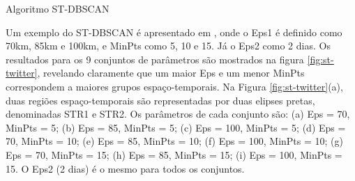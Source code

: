 \pagebreak
\begin{algorithm}[!ht]
	\SetSpacedAlgorithm
	\caption{\label{alg:algoritmo_stdbscan}Algoritmo \acrshort{ST-DBSCAN}}
\end{algorithm}

Um exemplo do \acrshort{ST-DBSCAN} é apresentado em \cite{st-twitter}, onde o Eps1 é definido como 70km, 85km e 100km, e MinPts como 5, 10 e 15. Já o Eps2 como 2 dias. Os resultados para os 9 conjuntos de parâmetros são mostrados na figura \ref{fig:st-twitter}, revelando claramente que um maior Eps e um menor MinPts correspondem a maiores grupos espaço-temporais. Na Figura \ref{fig:st-twitter}(a), duas regiões espaço-temporais são representadas por duas elipses pretas, denominadas STR1 e STR2.
Os parâmetros de cada conjunto são:
(a) Eps = 70, MinPts = 5; (b) Eps = 85, MinPts = 5; (c) Eps = 100, MinPts = 5; (d) Eps = 70, MinPts = 10; (e) Eps = 85, MinPts = 10; (f) Eps = 100, MinPts = 10; (g) Eps = 70, MinPts = 15; (h) Eps = 85, MinPts = 15; (i) Eps = 100, MinPts = 15. O Eps2 (2 dias) é o mesmo para todos os conjuntos.

